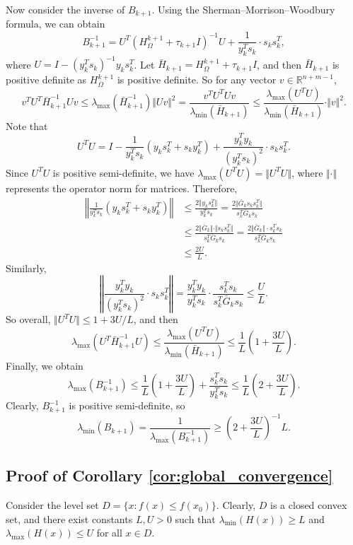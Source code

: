\documentclass{article}
\theoremstyle{plain}
\theoremstyle{definition}
\theoremstyle{remark}
\begin{document}
Now consider the inverse of $B_{k+1}$. Using the Sherman--Morrison--Woodbury
formula, we can obtain
\[
B_{k+1}^{-1}=U^{T}(H_{\Omega}^{k+1}+\tau_{k+1} I)^{-1}U+\frac{1}{y_{k}^{T}s_{k}}\cdot s_{k}s_{k}^{T},
\]
where $U=I-(y_{k}^{T}s_{k})^{-1}y_{k}s_{k}^{T}$. Let $\bar{H}_{k+1}=H_{\Omega}^{k+1}+\tau_{k+1} I$, and then $\bar{H}_{k+1}$ is positive definite as $H_{\Omega}^{k+1}$ is positive definite. So for any vector $v\in\mathbb{R}^{n+m-1}$,
\[
v^{T}U^{T}\bar{H}_{k+1}^{-1}Uv\le\lambda_{\max}(\bar{H}_{k+1}^{-1})\Vert Uv\Vert^{2}=\frac{v^{T}U^{T}Uv}{\lambda_{\min}(\bar{H}_{k+1})}\le\frac{\lambda_{\max}(U^{T}U)}{\lambda_{\min}(\bar{H}_{k+1})}\cdot\Vert v\Vert^{2}.
\]
Note that
\[
U^{T}U=I-\frac{1}{y_{k}^{T}s_{k}}(y_{k}s_{k}^{T}+s_{k}y_{k}^{T})+\frac{y_{k}^{T}y_{k}}{(y_{k}^{T}s_{k})^{2}}\cdot s_{k}s_{k}^{T}.
\]
Since $U^{T}U$ is positive semi-definite, we have $\lambda_{\max}(U^{T}U)=\Vert U^{T}U\Vert$,
where $\Vert\cdot\Vert$ represents the operator norm for matrices.
Therefore,
\begin{align*}
\left\Vert \frac{1}{y_{k}^{T}s_{k}}(y_{k}s_{k}^{T}+s_{k}y_{k}^{T})\right\Vert  & \le\frac{2\Vert y_{k}s_{k}^{T}\Vert}{y_{k}^{T}s_{k}}=\frac{2\Vert\bar{G}_{k}s_{k}s_{k}^{T}\Vert}{s_{k}^{T}\bar{G}_{k}s_{k}}\\
 & \le\frac{2\Vert\bar{G}_{k}\Vert\cdot\Vert s_{k}s_{k}^{T}\Vert}{s_{k}^{T}\bar{G}_{k}s_{k}}=\frac{2\Vert\bar{G}_{k}\Vert\cdot s_{k}^{T}s_{k}}{s_{k}^{T}\bar{G}_{k}s_{k}}\\
 & \le\frac{2U}{L}.
\end{align*}
Similarly,
\[
\left\Vert \frac{y_{k}^{T}y_{k}}{(y_{k}^{T}s_{k})^{2}}\cdot s_{k}s_{k}^{T}\right\Vert =\frac{y_{k}^{T}y_{k}}{y_{k}^{T}s_{k}}\cdot\frac{s_{k}^{T}s_{k}}{s_{k}^{T}\bar{G}_{k}s_{k}}\le\frac{U}{L}.
\]
So overall, $\Vert U^{T}U\Vert\le1+3U/L$, and then
\[
\lambda_{\max}\left(U^{T}\bar{H}_{k+1}^{-1}U\right)\le\frac{\lambda_{\max}(U^{T}U)}{\lambda_{\min}(\bar{H}_{k+1})}\le\frac{1}{L}\left(1+\frac{3U}{L}\right).
\]
Finally, we obtain
\[
\lambda_{\max}(B_{k+1}^{-1})\le\frac{1}{L}\left(1+\frac{3U}{L}\right)+\frac{s_{k}^{T}s_{k}}{y_{k}^{T}s_{k}}\le\frac{1}{L}\left(2+\frac{3U}{L}\right).
\]
Clearly, $B_{k+1}^{-1}$ is positive semi-definite, so
\[
\lambda_{\min}(B_{k+1})=\frac{1}{\lambda_{\max}(B_{k+1}^{-1})}\ge\left(2+\frac{3U}{L}\right)^{-1}L.
\]

\subsection{Proof of Corollary \ref{cor:global_convergence}}
Consider the level set $D=\{x:f(x)\le f(x_0)\}$. Clearly, $D$ is a closed convex set, and there exist constants $L,U>0$ such that $\lambda_{\min}(H(x))\ge L$ and $\lambda_{\max}(H(x))\le U$ for all $x\in D$.
\end{document}
